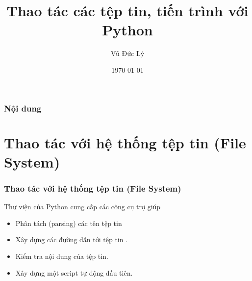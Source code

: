 \documentclass{beamer}
\title[Thao tác hệ thống file, tiến trình với Python ]{Thao tác các tệp tin, tiến trình với Python } %
\author{Vũ Đức Lý} %
\date{\today} %
\begin{document}
\begin{frame}
\titlepage %
\hyperlink{intro}{}
\end{frame}

\begin{frame}[label=intro]
\frametitle{Nội dung} %
\tableofcontents %
\end{frame}


\section{Thao tác với hệ thống tệp tin (File System)} 
\begin{frame}[label=teptin]
\frametitle{Thao tác với hệ thống tệp tin (File System)}
Thư viện của Python cung cấp các công cụ trợ giúp
\begin{itemize}
\item Phân tách (parsing) các tên tệp tin \hyperlink{lamviecteptin}{\beamerbutton{$\unrhd$}}
\item Xây dựng các đường dẫn tới tệp tin \hyperlink{xaydungduongdan}{\beamerbutton{$\unrhd$}}.
\item Kiểm tra nội dung của tệp tin.\hyperlink{kiemtranoidung}{\beamerbutton{$\unrhd$}}
\item Xây dựng một script tự động đầu tiên.\hyperlink{scriptdautien}{\beamerbutton{$\unrhd$}}
\end{itemize} 
\hyperlink{intro}{}
\hyperlink{moitruong}{}
\end{frame}
\end{document}
